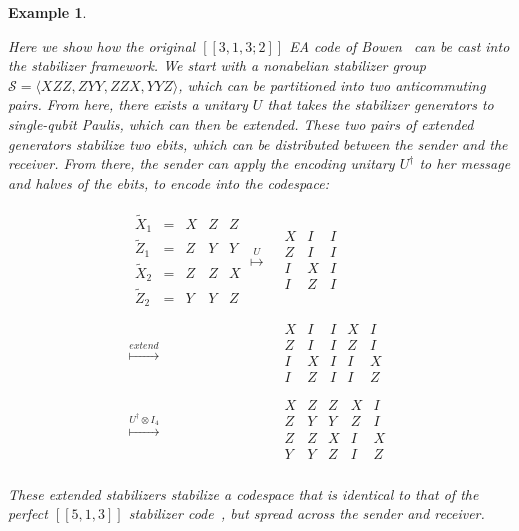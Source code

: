 \documentclass[]{amsart}
\newtheorem{example}[theorem]{Example}
\begin{document}
\begin{example}\label{ex:stabea5}

    Here we show how the original $\left[\!\left[3,1,3;2\right]\!\right]$ EA code of Bowen~\cite{Bow2002} can be cast into the stabilizer framework.
    We start with a nonabelian stabilizer group $\mathcal{S}=\langle XZZ,ZYY,ZZX,YYZ\rangle$, which can be partitioned into two anticommuting pairs.
    From here, there exists a unitary $U$ that takes the stabilizer generators to single-qubit Paulis, which can then be extended.
    These two pairs of extended generators stabilize two ebits, which can be distributed between the sender and the receiver.
    From there, the sender can apply the encoding unitary $U^\dagger$ to her message and halves of the ebits, to encode into the codespace:

    \begin{align*}
        \begin{array}{ccccc}
            \widetilde{X}_1 & = & X & Z & Z \\
            \widetilde{Z}_1 & = & Z & Y & Y \\
            \widetilde{X}_2 & = & Z & Z & X \\
            \widetilde{Z}_2 & = & Y & Y & Z \\
        \end{array}
        \overset{U}{\longmapsto} & 
        \begin{array}{ccc}
            X & I & I \\
            Z & I & I \\
            I & X & I \\
            I & Z & I \\
        \end{array} \\
        \overset{extend}{\longmapsto} & 
        \begin{array}{ccc|cc}
            X & I & I & X & I \\
            Z & I & I & Z & I \\
            I & X & I & I & X \\
            I & Z & I & I & Z \\
        \end{array} \\
        \overset{U^\dagger\otimes I_4}{\longmapsto} & 
        \begin{array}{ccc|cc}
            X & Z & Z & X & I \\
            Z & Y & Y & Z & I \\
            Z & Z & X & I & X \\
            Y & Y & Z & I & Z \\
        \end{array}
    \end{align*}

    These extended stabilizers stabilize a codespace that is identical to that of the perfect $\left[\!\left[5,1,3\right]\!\right]$ stabilizer code~\cite{LMPZ1996,BDSW1996}, but spread across the sender and receiver.
\end{example}
\end{document}
